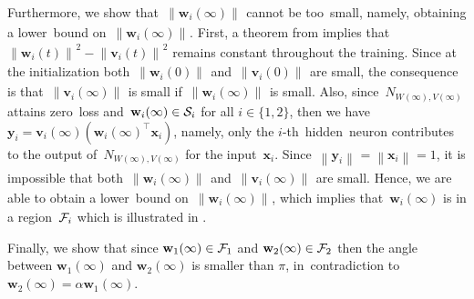 \documentclass[handout,usenames,dvipsnames]{beamer} %
\newcommand{\norm}[2][]{{\left\|{#2}\right\|_{#1}}}
\newcommand{\bx}{\mathbf{x}}
\newcommand{\bw}{\mathbf{w}}
\newcommand{\bv}{\mathbf{v}}
\newcommand{\by}{\mathbf{y}}
\newcommand{\cf}{{\cal F}}
\newcommand{\cs}{{\cal S}}
\begin{document}
\begin{frame}
{        Furthermore, we show that~$\norm{\bw_i(\infty)}$ cannot be too~small, namely, obtaining a lower~bound on~$\norm{\bw_i(\infty)}$. First, a theorem from \cite{du2018algorithmic} implies that~$\norm{\bw_i(t)}^2 - \norm{\bv_i(t)}^2$ remains constant throughout the training. Since at the initialization both~$\norm{\bw_i(0)}$ and~$\norm{\bv_i(0)}$ are small, the consequence is that~$\norm{\bv_i(\infty)}$ is small if~$\norm{\bw_i(\infty)}$ is small.
        Also, since~$N_{W(\infty),V(\infty)}$ attains zero~loss and~$\bw_i(\infty) \in \cs_i$ for all $i \in \{1,2\}$, then we have~$\by_i = \bv_i(\infty) (\bw_i(\infty)^\top \bx_i)$, namely, only the $i$-th~hidden~neuron contributes to the output of~$N_{W(\infty),V(\infty)}$ for the input~$\bx_i$. Since~$\norm{\by_i}=\norm{\bx_i}=1$, it is impossible that both~$\norm{\bw_i(\infty)}$ and~$\norm{\bv_i(\infty)}$ are small. Hence, we are able to obtain a lower~bound on~$\norm{\bw_i(\infty)}$, which implies that~$\bw_i(\infty)$ is in a region~$\cf_i$ which is illustrated in .
        
        Finally, we show that since $\bw_1(\infty) \in \cf_1$ and $\bw_2(\infty) \in \cf_2$ then the angle between $\bw_1(\infty)$ and $\bw_2(\infty)$ is smaller than $\pi$, in~contradiction to $\bw_2(\infty) = \alpha \bw_1(\infty)$.
    }
\end{frame}
\end{document}
